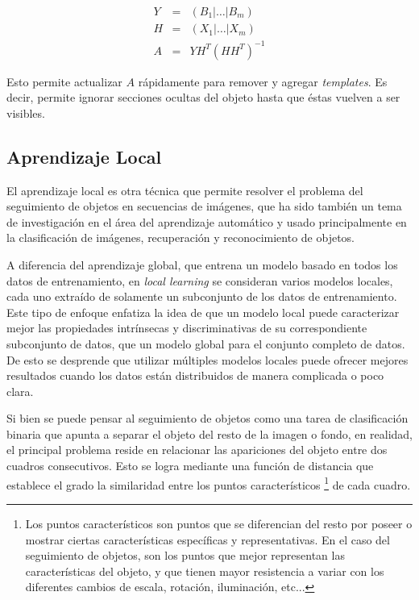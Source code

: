 \documentclass[a4paper,10pt]{article}
\begin{document}
\begin{eqnarray*}
    Y &=& \left( B_1 \lvert \dots \lvert B_m \right) \\
    H &=& \left( X_1 \lvert \dots \lvert X_m \right) \\
    A &=& Y H^T(HH^T)^{-1}
\end{eqnarray*}

Esto permite actualizar $A$
rápidamente para remover y agregar \textit{templates}. Es decir, permite ignorar
secciones ocultas del objeto hasta que éstas vuelven a ser visibles.

\subsection{Aprendizaje Local}

El aprendizaje local es otra técnica que permite resolver el problema del seguimiento de objetos en secuencias de imágenes,
que ha sido también un tema de investigación en el área del aprendizaje automático \cite{local-learning-machine-learning} y usado principalmente en la clasificación
de imágenes, recuperación y reconocimiento de objetos.

A diferencia del aprendizaje global, que entrena un modelo basado en
todos los datos de entrenamiento, en \textit{local learning} se consideran
varios modelos locales, cada uno extraído de solamente un subconjunto de los
datos de entrenamiento. Este tipo de enfoque enfatiza la idea de que un modelo
local puede caracterizar mejor las propiedades intrínsecas y discriminativas de
su correspondiente subconjunto de datos, que un modelo global para el conjunto
completo de datos. De esto se desprende que utilizar múltiples modelos locales
puede ofrecer mejores resultados cuando los datos están distribuidos de manera
complicada o poco clara.

Si bien se puede pensar al seguimiento de objetos como una tarea de clasificación binaria
que apunta a separar el objeto del resto de la imagen o fondo, en realidad, el principal
problema reside en relacionar las apariciones del objeto entre dos cuadros
consecutivos. Esto se logra mediante una función de distancia que
establece el grado la similaridad entre los puntos característicos \footnote{Los puntos
  característicos son puntos que se diferencian del resto por poseer o mostrar
ciertas características específicas y representativas. En el caso del
seguimiento de objetos, son los puntos que mejor representan las
características del objeto, y que tienen mayor resistencia a variar con los
diferentes cambios de escala, rotación, iluminación, etc...} de cada cuadro.
\end{document}
